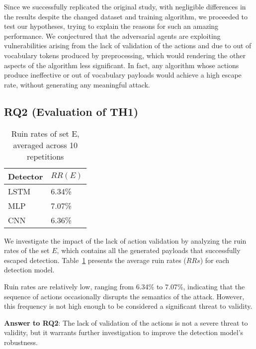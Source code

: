 Since we successfully replicated the original study, with negligible differences in the results despite the changed dataset and training algorithm, we proceeded to test our hypotheses, trying to explain the reasons for such an amazing performance. We conjectured that the adversarial agents are exploiting vulnerabilities arising from the lack of validation of the actions and due to out of vocabulary tokens produced by preprocessing, which would rendering the other aspects of the algorithm less significant. In fact, any algorithm whose actions produce ineffective or out of vocabulary payloads would achieve a high escape rate, without generating any meaningful attack.



\subsection{RQ2 (Evaluation of TH1)} \label{sec:rq2}


\begin{table}[!h]
\caption{Ruin rates of  set E, averaged across 10 repetitions} \label{tab:rq2}
\centering
\scalebox {1.0} {

\begin{tabular}{ll}
    \toprule
    Detector & $RR(E)$ \\
    \midrule
    LSTM            & 6.34\%     \\
    MLP             & 7.07\%     \\
    CNN             & 6.36\%     \\
    \bottomrule
\end{tabular}

}
\end{table}


We  investigate the impact of the lack of action validation by analyzing the ruin rates of the set $E$, which contains all the generated payloads that successfully escaped detection. Table~\ref{tab:rq2} presents the average ruin rates ($RRs$) for each detection model.

Ruin rates are relatively low, ranging from 6.34\% to 7.07\%, indicating that the sequence of actions occasionally disrupts the semantics of the attack. However, this frequency is not high enough to be considered a significant threat to validity.

\begin{tcolorbox}[boxrule=0pt,frame hidden,sharp corners,enhanced,borderline north={1pt}{0pt}{black},borderline south={1pt}{0pt}{black},boxsep=2pt,left=2pt,right=2pt,top=2.5pt,bottom=2pt]
\textbf{Answer to RQ2}: The lack of validation of the actions is not a severe threat to validity, but it warrants further investigation to improve the detection model's robustness.
\end{tcolorbox}

